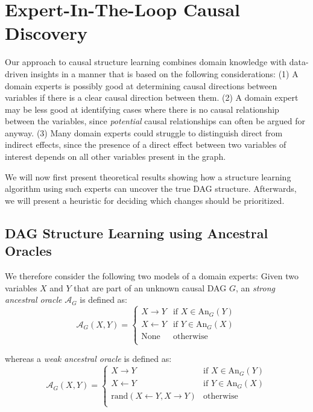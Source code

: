 \documentclass{uai2025} %
\begin{document}
\section{Expert-In-The-Loop Causal Discovery}


Our approach to causal structure learning combines domain knowledge with data-driven
insights in a manner that is based on the following considerations: 
(1) A domain experts is possibly good at determining causal directions between variables if 
there is a clear causal direction between them. (2) A domain expert may be less good
at identifying cases where there is no causal relationship between the variables,
since \emph{potential} causal relationships can often be argued for anyway.
(3) Many domain experts could struggle to distinguish direct from indirect 
effects, since the presence of a direct effect between two variables
of interest depends on all other variables present in the graph. 

We will now first present theoretical results showing how a structure
learning algorithm using such experts can uncover the true DAG structure.
Afterwards, we will present a heuristic for deciding which changes should
be prioritized.

\subsection{DAG Structure Learning using Ancestral Oracles}

\label{sec:modification}

We therefore consider the following two models of a domain experts: Given two variables
$ X $ and $ Y $ that are part of an unknown causal DAG $G$, an \emph{strong ancestral oracle} 
$\mathcal{A}_G$ is defined as:
$$\mathcal{A}_G(X,Y)=\begin{cases}
 X \to Y & \textrm{if } X \in \textrm{An}_G(Y) \\
 X \gets Y & \textrm{if } Y \in \textrm{An}_G(X) \\
 \textrm{None} & \textrm{otherwise} \\
\end{cases}$$

whereas a \emph{weak ancestral oracle} is defined as:
$$
\mathcal{A}_G(X,Y)=\begin{cases}
 X \to Y & \textrm{if } X \in \textrm{An}_G(Y) \\
 X \gets Y & \textrm{if } Y \in \textrm{An}_G(X) \\
 \textrm{rand}(X \gets Y, X \to Y) & \textrm{otherwise} \\
\end{cases}
$$
\end{document}
